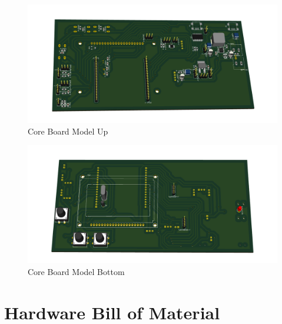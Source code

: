 \documentclass[12pt,]{book}
\begin{document}
	\begin{figure}[H]
		\centering
		\includegraphics[width=0.7\linewidth]{images/old_board_F3d}
		\caption{Core Board Model Up}
	\end{figure}
	
	\begin{figure}[H]
		\centering
		\includegraphics[width=0.7\linewidth]{images/old_board_B3d}
		\caption{Core Board Model Bottom}
	\end{figure}

	\newpage
	\begin{landscape}
		
	\end{landscape}
	
	\section{Hardware Bill of Material}
	
\end{document}
